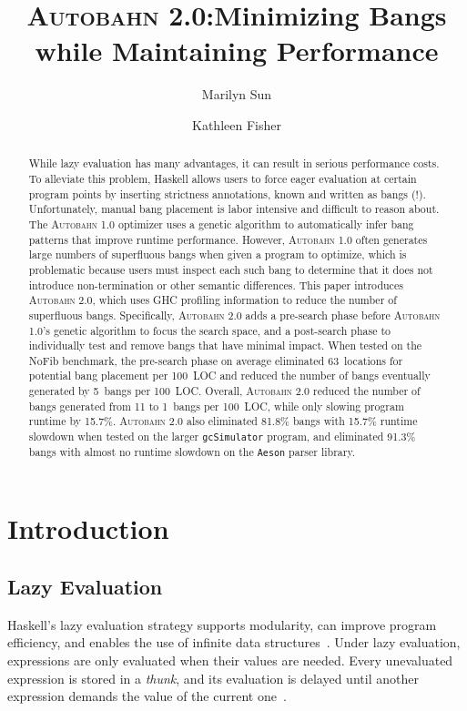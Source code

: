 \documentclass[format=sigplan, review=true]{acmart}
\newcommand{\Ao}[0]{\textsc{Autobahn 1.0}}
\newcommand{\At}[0]{\textsc{Autobahn 2.0}}
\newcommand{\preopt}[0]{pre-search}
\newcommand{\postopt}[0]{post-search}
\begin{document}
\title{\At:\break Minimizing Bangs while Maintaining Performance}
\author{Marilyn Sun}
\author{Kathleen Fisher}
\begin{abstract}

While lazy evaluation has many advantages, it can result in serious
performance costs. To alleviate this problem, Haskell allows users to
force eager evaluation at certain program points by inserting
strictness annotations, known and written as bangs (!).
Unfortunately, manual bang placement
is labor intensive and difficult to reason about. The \Ao{}
optimizer uses a genetic algorithm to automatically infer bang patterns
that improve runtime performance. However, \Ao{} often generates
large numbers of superfluous bangs when given a program to optimize,
which is problematic because users must inspect each such bang to
determine that it does not introduce non-termination or other semantic
differences. 
This paper introduces \At, which uses GHC
profiling information to reduce the number of superfluous bangs.
Specifically,
\At{} adds a \preopt{} phase before \Ao's genetic algorithm
to focus the search space, and a \postopt{} phase to
individually test and remove bangs that have minimal impact. When tested on the NoFib benchmark, the \preopt{}
phase on average eliminated 63~locations for potential bang
placement per 100~LOC and reduced the number of bangs eventually
generated by 5~bangs per 100~LOC. Overall, \At{} reduced the number of
bangs generated from 11 to 1~bangs per 100~LOC, while only
slowing program runtime by 15.7\%. \At{} also eliminated 81.8\% bangs with 15.7\% runtime slowdown when tested on the larger \texttt{gcSimulator} program, 
and eliminated 91.3\% bangs with almost no runtime slowdown on the \texttt{Aeson} parser library.
\end{abstract}


\maketitle

\section{Introduction}

\subsection{Lazy Evaluation}
Haskell's lazy evaluation strategy supports modularity, can improve
program efficiency, and enables the use of infinite data
structures~\cite{Hughes89}. Under lazy evaluation, expressions are
only evaluated when their values are needed. Every unevaluated
expression is stored in a \textit{thunk}, and its evaluation is
delayed until another expression demands the value of the current
one~\cite{PeytonJones89}. 
\end{document}
